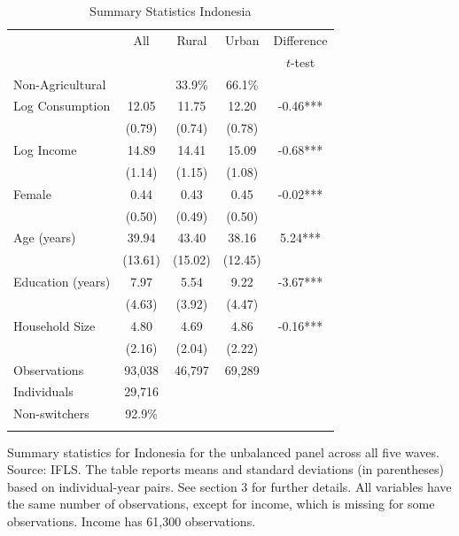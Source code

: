 \begin{table}[htbp] \centering \caption{Summary Statistics Indonesia}\label{tab:summary_stats_IDN_unb_nonag} \begin{threeparttable} \begin{tabular}{l cccc} \toprule
& All & Rural & Urban & Difference \\
 &  &  &  & $t$-test \\
\midrule
Non-Agricultural &  &   33.9\% &   66.1\% &  \\  \addlinespace \addlinespace
Log Consumption & 12.05 & 11.75 & 12.20 & -0.46*** \\
 & (0.79) & (0.74) & (0.78) &  \\  \addlinespace
Log Income & 14.89 & 14.41 & 15.09 & -0.68*** \\
 & (1.14) & (1.15) & (1.08) &  \\  \addlinespace
Female & 0.44 & 0.43 & 0.45 & -0.02*** \\
 & (0.50) & (0.49) & (0.50) &  \\  \addlinespace
Age (years) & 39.94 & 43.40 & 38.16 & 5.24*** \\
 & (13.61) & (15.02) & (12.45) &  \\  \addlinespace
Education (years) & 7.97 & 5.54 & 9.22 & -3.67*** \\
 & (4.63) & (3.92) & (4.47) &  \\  \addlinespace
Household Size & 4.80 & 4.69 & 4.86 & -0.16*** \\
 & (2.16) & (2.04) & (2.22) &  \\  \addlinespace


\cmidrule{2-5}
Observations & 93,038 & 46,797 & 69,289 &  \\  
Individuals & 29,716 &  &  &  \\
Non-switchers &   92.9\% &  &  &  \\  \addlinespace
\bottomrule \end{tabular} \begin{tablenotes}[flushleft] \footnotesize \item{Summary statistics for Indonesia for the unbalanced panel across all five waves. Source: IFLS. The table reports means and standard deviations (in parentheses) based on individual-year pairs. See section 3 for further details. All variables have the same number of observations, except for income, which is missing for some observations. Income has 61,300 observations.} \end{tablenotes} \end{threeparttable} \end{table}